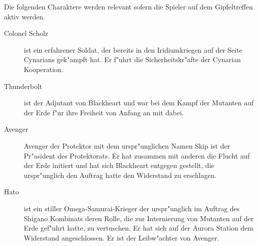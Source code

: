 
Die folgenden Charaktere werden relevant sofern die Spieler auf dem Gipfeltreffen aktiv werden.

\begin{description}
    \item[Colonel Scholz] ist ein erfahrener Soldat, der bereits in den Iridiumkriegen auf der Seite Cynarians gek"ampft hat. Er f"uhrt 
        die Sicherheitskr"afte der Cynarian Kooperation.
    \item[Thunderbolt] ist der Adjutant von Blackheart und war bei dem Kampf der Mutanten auf der Erde f"ur ihre Freiheit von Anfang an mit dabei.
    \item[Avenger] Avenger der Protektor mit dem urspr"unglichen Namen Skip ist der Pr"asident des Protektorats. Er hat zusammen mit 
        anderen die Flucht auf der Erde initiert und hat sich Blackheart entgegen gestellt, die urspr"unglich den Auftrag hatte den Widerstand zu erschlagen.
    \item[Hato] ist ein stiller Omega-Samurai-Krieger der urspr"unglich im Auftrag des Shigano Kombinats deren Rolle, die zur Internierung 
        von Mutanten auf der Erde gef"uhrt hatte, zu vertuschen. Er hat sich auf der Aurora Station dem Widerstand angeschlossen. Er ist der Leibw"achter von Avenger.
\end{description}
\vfill\pagebreak

